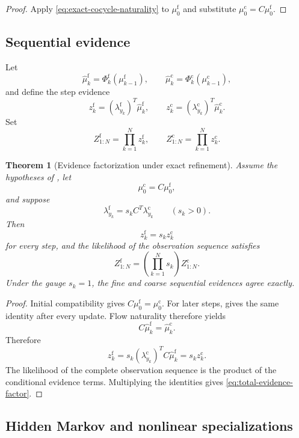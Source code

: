 \documentclass[11pt]{article}
\newtheorem{theorem}{Theorem}[section]
\theoremstyle{definition}
\theoremstyle{remark}
\newcommand{\fine}{\mathrm f}
\newcommand{\coarse}{\mathrm c}
\begin{document}
\begin{proof}
Apply \eqref{eq:exact-cocycle-naturality} to $\mu_0^{\fine}$ and substitute $\mu_0^{\coarse}=C\mu_0^{\fine}$.
\end{proof}

\subsection{Sequential evidence}
Let
\[
  \widehat\mu_k^{\fine}
  =\Phi_k^{\fine}(\mu_{k-1}^{\fine}),
  \qquad
  \widehat\mu_k^{\coarse}
  =\Phi_k^{\coarse}(\mu_{k-1}^{\coarse}),
\]
and define the step evidence
\[
  z_k^{\fine}
  =(\lambda_{y_k}^{\fine})^T\widehat\mu_k^{\fine},
  \qquad
  z_k^{\coarse}
  =(\lambda_{y_k}^{\coarse})^T\widehat\mu_k^{\coarse}.
\]
Set
\[
  Z_{1:N}^{\fine}=\prod_{k=1}^N z_k^{\fine},
  \qquad
  Z_{1:N}^{\coarse}=\prod_{k=1}^N z_k^{\coarse}.
\]

\begin{theorem}[Evidence factorization under exact refinement]\label{thm:evidence-factorization}
Assume the hypotheses of , let
\[
  \mu_0^{\coarse}=C\mu_0^{\fine},
\]
and suppose
\[
  \lambda_{y_k}^{\fine}
  =s_kC^T\lambda_{y_k}^{\coarse}
  \qquad(s_k>0).
\]
Then
\begin{equation}\label{eq:step-evidence-factor}
  z_k^{\fine}=s_kz_k^{\coarse}
\end{equation}
for every step, and the likelihood of the observation sequence satisfies
\begin{equation}\label{eq:total-evidence-factor}
  \boxed{
  Z_{1:N}^{\fine}
  =
  \left(\prod_{k=1}^Ns_k\right)
  Z_{1:N}^{\coarse}.}
\end{equation}
Under the gauge $s_k=1$, the fine and coarse sequential evidences agree exactly.
\end{theorem}

\begin{proof}
Initial compatibility gives $C\mu_0^{\fine}=\mu_0^{\coarse}$.  For later steps,  gives the same identity after every update.  Flow naturality therefore yields
\[
  C\widehat\mu_k^{\fine}=\widehat\mu_k^{\coarse}.
\]
Therefore
\[
  z_k^{\fine}
  =s_k(\lambda_{y_k}^{\coarse})^TC\widehat\mu_k^{\fine}
  =s_kz_k^{\coarse}.
\]
The likelihood of the complete observation sequence is the product of the conditional evidence terms.  Multiplying the identities gives \eqref{eq:total-evidence-factor}.
\end{proof}

\subsection{Hidden Markov and nonlinear specializations}
\end{document}
